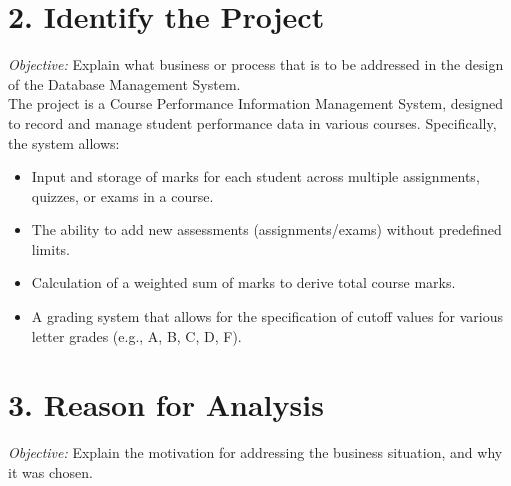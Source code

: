 \documentclass[12pt]{article}
\begin{document}
\section*{2. Identify the Project}
\textit{Objective:} Explain what business or process that is to be addressed in the design of the Database Management System. \\

\noindent
The project is a Course Performance Information Management System, designed to record and manage student performance data in various courses. Specifically, the system allows:
\begin{itemize}
\item Input and storage of marks for each student across multiple assignments, quizzes, or exams in a course.
\item The ability to add new assessments (assignments/exams) without predefined limits.
\item Calculation of a weighted sum of marks to derive total course marks.
\item A grading system that allows for the specification of cutoff values for various letter grades (e.g., A, B, C, D, F).
\end{itemize}

\section*{3. Reason for Analysis}
\textit{Objective:} Explain the motivation for addressing the business situation, and why it was chosen.
\end{document}
